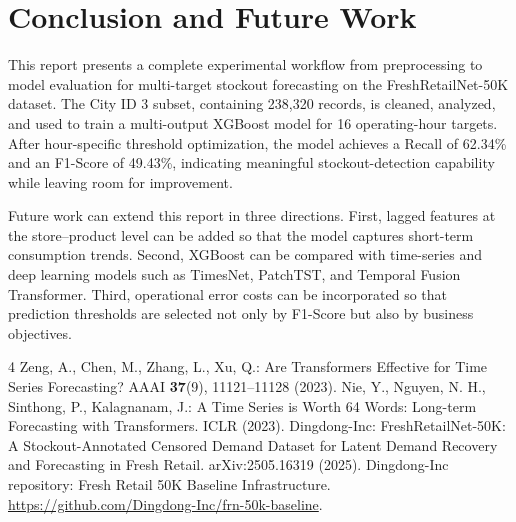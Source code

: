 \documentclass{llncs}
\begin{document}
\section{Conclusion and Future Work}
This report presents a complete experimental workflow from preprocessing to model evaluation for multi-target stockout forecasting on the FreshRetailNet-50K dataset. The City ID 3 subset, containing 238,320 records, is cleaned, analyzed, and used to train a multi-output XGBoost model for 16 operating-hour targets. After hour-specific threshold optimization, the model achieves a Recall of 62.34\% and an F1-Score of 49.43\%, indicating meaningful stockout-detection capability while leaving room for improvement.

Future work can extend this report in three directions. First, lagged features at the store--product level can be added so that the model captures short-term consumption trends. Second, XGBoost can be compared with time-series and deep learning models such as TimesNet, PatchTST, and Temporal Fusion Transformer. Third, operational error costs can be incorporated so that prediction thresholds are selected not only by F1-Score but also by business objectives.

\begin{thebibliography}{4}
 Zeng, A., Chen, M., Zhang, L., Xu, Q.: Are Transformers Effective for Time Series Forecasting? AAAI \textbf{37}(9), 11121--11128 (2023).
 Nie, Y., Nguyen, N. H., Sinthong, P., Kalagnanam, J.: A Time Series is Worth 64 Words: Long-term Forecasting with Transformers. ICLR (2023).
 Dingdong-Inc: FreshRetailNet-50K: A Stockout-Annotated Censored Demand Dataset for Latent Demand Recovery and Forecasting in Fresh Retail. arXiv:2505.16319 (2025).
 Dingdong-Inc repository: Fresh Retail 50K Baseline Infrastructure. \url{https://github.com/Dingdong-Inc/frn-50k-baseline}.
\end{thebibliography}
\end{document}
